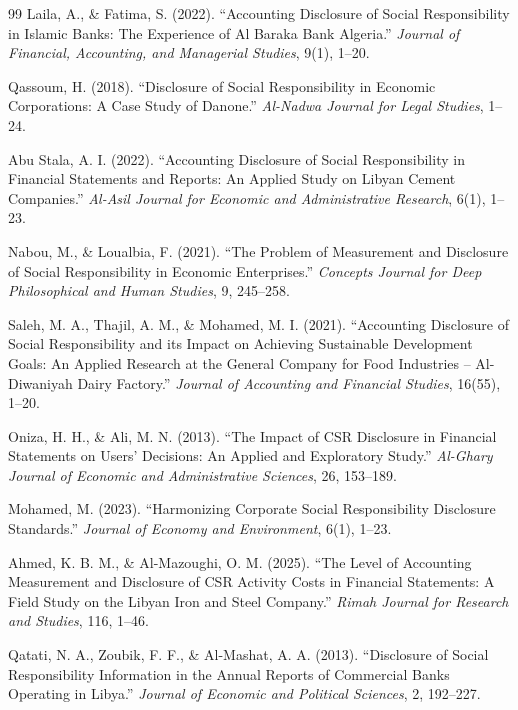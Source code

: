 \documentclass[10pt]{NSP1}
\begin{document}
\begin{thebibliography}{99}
		Laila, A., \& Fatima, S. (2022). ``Accounting Disclosure of Social Responsibility in Islamic Banks: The Experience of Al Baraka Bank Algeria.'' \emph{Journal of Financial, Accounting, and Managerial Studies}, 9(1), 1--20.
		
		Qassoum, H. (2018). ``Disclosure of Social Responsibility in Economic Corporations: A Case Study of Danone.'' \emph{Al-Nadwa Journal for Legal Studies}, 1--24.
		
		Abu Stala, A. I. (2022). ``Accounting Disclosure of Social Responsibility in Financial Statements and Reports: An Applied Study on Libyan Cement Companies.'' \emph{Al-Asil Journal for Economic and Administrative Research}, 6(1), 1--23.
		
		Nabou, M., \& Loualbia, F. (2021). ``The Problem of Measurement and Disclosure of Social Responsibility in Economic Enterprises.'' \emph{Concepts Journal for Deep Philosophical and Human Studies}, 9, 245--258.
		
		Saleh, M. A., Thajil, A. M., \& Mohamed, M. I. (2021). ``Accounting Disclosure of Social Responsibility and its Impact on Achieving Sustainable Development Goals: An Applied Research at the General Company for Food Industries – Al-Diwaniyah Dairy Factory.'' \emph{Journal of Accounting and Financial Studies}, 16(55), 1--20.
		
		Oniza, H. H., \& Ali, M. N. (2013). ``The Impact of CSR Disclosure in Financial Statements on Users' Decisions: An Applied and Exploratory Study.'' \emph{Al-Ghary Journal of Economic and Administrative Sciences}, 26, 153--189.
		
		Mohamed, M. (2023). ``Harmonizing Corporate Social Responsibility Disclosure Standards.'' \emph{Journal of Economy and Environment}, 6(1), 1--23.
		
		Ahmed, K. B. M., \& Al-Mazoughi, O. M. (2025). ``The Level of Accounting Measurement and Disclosure of CSR Activity Costs in Financial Statements: A Field Study on the Libyan Iron and Steel Company.'' \emph{Rimah Journal for Research and Studies}, 116, 1--46.
		
		Qatati, N. A., Zoubik, F. F., \& Al-Mashat, A. A. (2013). ``Disclosure of Social Responsibility Information in the Annual Reports of Commercial Banks Operating in Libya.'' \emph{Journal of Economic and Political Sciences}, 2, 192--227.
		

\end{thebibliography}
\end{document}
